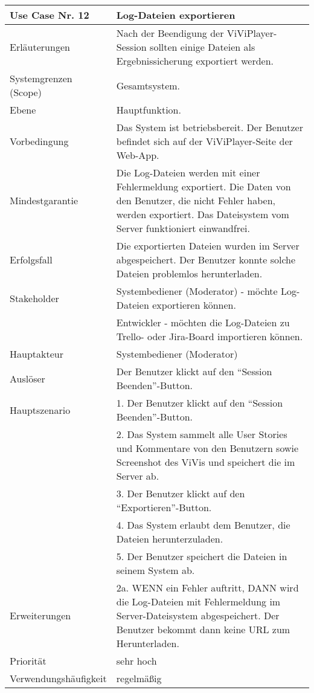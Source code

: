 \begin{tabularx}{\linewidth}{|l|X|}
	\hline
	Use Case Nr. 12			& \textbf{Log-Dateien exportieren} \\ \hline
	Erläuterungen			& Nach der Beendigung der ViViPlayer-Session sollten einige Dateien
							  als Ergebnissicherung exportiert werden. \\ \hline
	Systemgrenzen (Scope)	& Gesamtsystem. \\ \hline
	Ebene					& Hauptfunktion. \\ \hline
	Vorbedingung			& Das System ist betriebsbereit. Der Benutzer befindet sich auf der 
							  ViViPlayer-Seite der Web-App. \\ \hline
	Mindestgarantie			& Die Log-Dateien werden mit einer Fehlermeldung exportiert. Die 
							  Daten von den Benutzer, die nicht Fehler haben, werden exportiert. Das Dateisystem vom Server funktioniert einwandfrei.\\ \hline
	Erfolgsfall				& Die exportierten Dateien wurden im Server abgespeichert. Der 
							  Benutzer konnte solche Dateien problemlos herunterladen. \\ \hline
	Stakeholder				& Systembediener (Moderator) - möchte Log-Dateien exportieren 
							  können.\\ 
							& Entwickler - möchten die Log-Dateien zu Trello- oder Jira-Board 
							  importieren können. \\ \hline
	Hauptakteur				& Systembediener (Moderator) \\ \hline
	Auslöser				& Der Benutzer klickt auf den ``Session Beenden''-Button. \\ \hline	
	Hauptszenario			& 1. Der Benutzer klickt auf den ``Session Beenden''-Button. \\
							& 2. Das System sammelt alle User Stories und Kommentare von den 
							  Benutzern sowie Screenshot des ViVis und speichert die im Server 
							  ab. \\
							& 3. Der Benutzer klickt auf den ``Exportieren''-Button. \\
							& 4. Das System erlaubt dem Benutzer, die Dateien herunterzuladen. \\
							& 5. Der Benutzer speichert die Dateien in seinem System ab. 
							  \\ \hline
	Erweiterungen			& 2a. WENN ein Fehler auftritt, DANN wird die Log-Dateien mit 
							  Fehlermeldung im Server-Dateisystem abgespeichert. Der Benutzer bekommt dann keine URL zum Herunterladen. \\ \hline
	Priorität				& sehr hoch \\ \hline
	Verwendungshäufigkeit	& regelmäßig \\ \hline
\end{tabularx}

